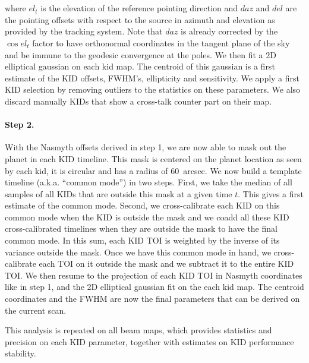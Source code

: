 \\
\\


where $el_t$ is the elevation of the reference pointing direction and $daz$ and
$del$ are the pointing offsets with respect to the source in azimuth and elevation as
provided by the tracking system. Note that $daz$ is already corrected by the
$\cos el_t$ factor to have orthonormal coordinates in the tangent plane of the sky
and be immune to the geodesic convergence at the poles. We then fit a 2D
elliptical gaussian on each kid map. The centroid of this gaussian is a first
estimate of the KID offsets, FWHM's, ellipticity and sensitivity. We apply a
first KID selection by removing outliers to the statistics on these
parameters. We also discard manually KIDs that show a cross-talk counter part on
their map. 

\paragraph{Step 2.} With the Nasmyth offsets derived in step 1, we are now able to
mask out the planet in each KID timeline. This mask is centered on the planet
location as seen by each kid, it is circular and has a radius of 60~arcsec. We
now build a template timeline (a.k.a. ``common mode'') in two steps. First, we
take the median of all samples of all KIDs that are outside this mask at a given
time $t$. This gives a first estimate of the common mode. Second, we
cross-calibrate each KID on this common mode when the KID is outside the mask
and we coadd all these KID cross-calibrated timelines when they are outside the
mask to have the final common mode. In this sum, each KID TOI is weighted by the
inverse of its variance outside the mask. Once we have this common mode in hand,
we cross-calibrate each TOI on it outside the mask and we subtract it to the
entire KID TOI. We then resume to the projection of each KID TOI in Nasmyth
coordinates like in step 1, and the 2D elliptical gaussian fit on the each kid
map. The centroid coordinates and the FWHM are now the final parameters that can
be derived on the current scan.

This analysis is repeated on all beam maps, which provides statistics and
precision on each KID parameter, together with estimates on KID performance stability.



